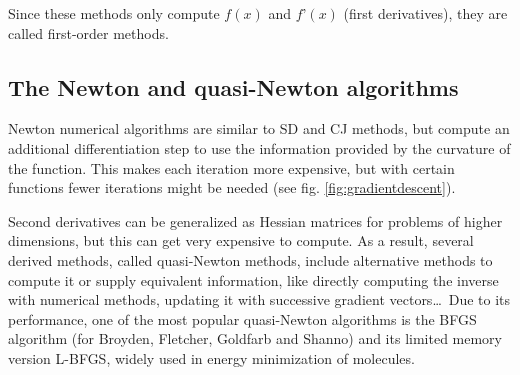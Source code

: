 Since these methods only compute $f(x)$ and $f’(x)$ (first derivatives), they are called first-order methods.

\subsection{The Newton and quasi-Newton algorithms}
Newton numerical algorithms are similar to SD and CJ methods, but compute an additional differentiation step to use the information provided by the curvature of the function. This makes each iteration more expensive, but with certain functions fewer iterations might be needed (see fig. \ref{fig:gradientdescent}).

Second derivatives can be generalized as Hessian matrices for problems of higher dimensions, but this can get very expensive to compute. As a result, several derived methods, called quasi-Newton methods, include alternative methods to compute it or supply equivalent information, like directly computing the inverse with numerical methods, updating it with successive gradient vectors\ldots\ Due to its performance, one of the most popular quasi-Newton algorithms is the BFGS algorithm (for Broyden,\cite{broyden1970convergence} Fletcher,\cite{fletcher1970new} Goldfarb\cite{goldfarb1970family} and Shanno\cite{shanno1970conditioning}) and its limited memory version L-BFGS,\cite{liu1989limited} widely used in energy minimization of molecules.

